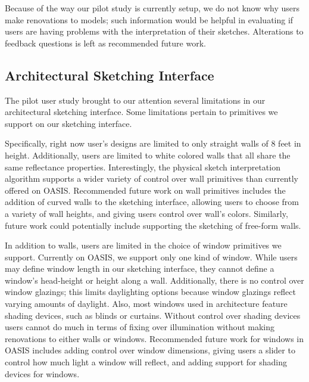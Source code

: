 		Because of the way our pilot study is currently setup, we do not know why users make renovations to models;
		such information would be helpful in evaluating if users are having problems with the interpretation of their sketches.
		Alterations to feedback questions is left as recommended future work.


\subsection{Architectural Sketching Interface}

	The pilot user study brought to our attention several limitations in our architectural sketching interface. Some limitations pertain to primitives we support on our sketching interface.

	Specifically, right now user's designs are limited to only straight walls of 8 feet in height. Additionally, users are limited to white colored walls that all share the same reflectance properties. Interestingly, the physical sketch interpretation algorithm supports a wider variety of control over wall primitives than currently offered on OASIS. Recommended future work on wall primitives includes the addition of curved walls to the sketching interface, allowing users to choose from a variety of wall heights, and giving users control over wall's colors. Similarly, future work could potentially include supporting the sketching of free-form walls.
	

	In addition to walls, users are limited in the choice of window primitives we support. Currently on OASIS, we support only one kind of window.
	While users may define window length in our sketching interface, they cannot define a window's head-height or height along a wall.
	Additionally, there is no control over window glazings; this limits daylighting options because window glazings reflect varying amounts of daylight. Also, most windows used in architecture feature shading devices, such as blinds or curtains. Without control over shading devices users cannot do much in terms of fixing over illumination without making renovations to either walls or windows. Recommended future work for windows in OASIS includes adding control over window dimensions, giving users a slider to control how much light a window will reflect, and adding support for shading devices for windows.
	

